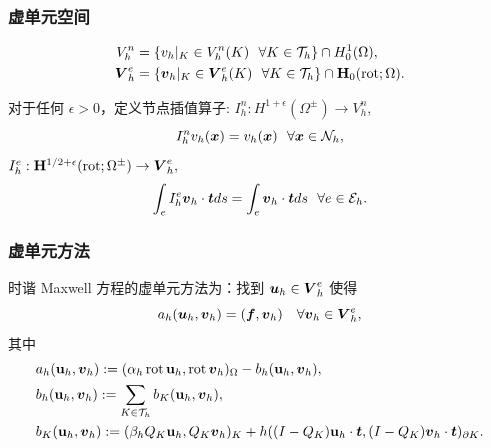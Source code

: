 \documentclass[notheorems,serif]{beamer}
\begin{document}
\begin{frame}
    \frametitle{虚单元空间}
\begin{definition}[全局空间]
    $$
\begin{aligned}
V^n_h & =  \{ v_h|_K \in V^n_h(K) ~~ \forall K\in \mathcal{T}_h \}  \cap H^1_0(\Omega) ,\\
\boldsymbol{V}^e_h & =  \{ \boldsymbol{v}_h|_K \in \boldsymbol{V}^e_h(K) ~~ \forall K\in \mathcal{T}_h \}  \cap \mathbf{H}_0(\operatorname{rot};\Omega) .
\end{aligned}
$$
\end{definition}

\begin{definition}[插值算子]
对于任何 $\epsilon>0$，定义节点插值算子:
$I^n_h : H^{1+\epsilon}(\Omega^{\pm}) \to V^n_h$, 
$$
I^n_hv_h(\boldsymbol{x}) = v_h(\boldsymbol{x}) ~~ \forall \boldsymbol{x}\in \mathcal{N}_h,
$$
$I^e_h : \mathbf{H}^{1/2+\epsilon}(\operatorname{rot}; \Omega^{\pm}) \to \boldsymbol{V}^e_h,$
$$
\int_e
I^e_h \boldsymbol{v}_h\cdot\boldsymbol{t} ds = \int_e \boldsymbol{v}_h\cdot\boldsymbol{t} d s ~~ \forall e\in
\mathcal{E}_h.
$$
\end{definition}
\end{frame}

\begin{frame}
  \frametitle{虚单元方法}
  时谐 Maxwell 方程的虚单元方法为：找到 $\boldsymbol{u}_h \in \boldsymbol{V}^e_h$ 使得
  $$
  a_h(\boldsymbol{u}_h, \boldsymbol{v}_h) = (\boldsymbol{f}, \boldsymbol{v}_h) \quad \forall \boldsymbol{v}_h \in \boldsymbol{V}^e_h,
  $$
  其中
\begin{subequations}
\label{vem1}
\begin{align}
&   a_h(\mathbf{u}_h,\boldsymbol{v}_h) := (\alpha_h \operatorname{rot}\mathbf{u}_h, \operatorname{rot}\boldsymbol{v}_h)_{\Omega} - b_h(\mathbf{u}_h,\boldsymbol{v}_h),  \label{vem11}   \\
&   b_h(\mathbf{u}_h,\boldsymbol{v}_h) := \sum_{K\in\mathcal{T}_h} b_K(\mathbf{u}_h,\boldsymbol{v}_h),  \label{vem12}  \\
&    b_K(\mathbf{u}_h,\boldsymbol{v}_h) := (\beta_hQ_K \mathbf{u}_h,Q_K \boldsymbol{v}_h )_{K} + h ( (I-Q_K )\mathbf{u}_h\cdot\boldsymbol{t} ,  (I-Q_K )\boldsymbol{v}_h\cdot\boldsymbol{t} )_{\partial K}.  \label{vem13}
\end{align}
\end{subequations}

\end{frame}
\end{document}
